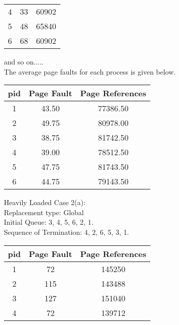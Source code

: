 \documentclass[a4paper,12pt]{article}
\begin{document}
\begin{enumerate}
\begin{table}[h!]
\begin{center}
\begin{tabular}{c|c|c}
             4   & 33   & 60902 \\
             5   & 48   & 65840 \\
             6   & 68   & 60902 \\
             \end{tabular}
           \end{center}
         \end{table}
         and so on.....\\
         The average page faults for each process is given below.
         \begin{table}[h!]
           \begin{center}
             \begin{tabular}{c|c|c}
             \textbf{pid} & \textbf{Page Fault} & \textbf{Page References} \\
             \hline
             1   & 43.50   & 77386.50 \\
             2   & 49.75   & 80978.00 \\
             3   & 38.75   & 81742.50 \\
             4   & 39.00   & 78512.50 \\
             5   & 47.75   & 81743.50 \\
             6   & 44.75   & 79143.50 \\
             \end{tabular}
           \end{center}
         \end{table}
    \item[Heavily Loaded]
         Case 2(a):\\
         Replacement type: Global\\
         Initial Queue: 3, 4, 5, 6, 2, 1.\\
         Sequence of Termination: 4, 2, 6, 5, 3, 1.\\
         \begin{table}[h!]
           \begin{center}
             \begin{tabular}{c|c|c}
             \textbf{pid} & \textbf{Page Fault} & \textbf{Page References} \\
             \hline
             1   & 72   & 145250 \\
             2   & 115  & 143488 \\
             3   & 127  & 151040 \\
             4   & 72   & 139712 \\

\end{tabular}
\end{center}
\end{table}
\end{enumerate}
\end{document}
